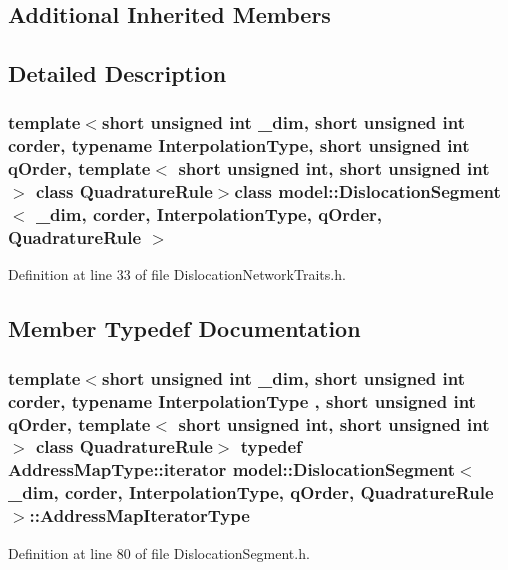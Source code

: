 \subsection*{Additional Inherited Members}


\subsection{Detailed Description}
\subsubsection*{template$<$short unsigned int \+\_\+dim, short unsigned int corder, typename Interpolation\+Type, short unsigned int q\+Order, template$<$ short unsigned int, short unsigned int $>$ class Quadrature\+Rule$>$class model\+::\+Dislocation\+Segment$<$ \+\_\+dim, corder, Interpolation\+Type, q\+Order, Quadrature\+Rule $>$}



Definition at line 33 of file Dislocation\+Network\+Traits.\+h.



\subsection{Member Typedef Documentation}
\hypertarget{classmodel_1_1_dislocation_segment_a43728c78eeaad4880736b8d7a42d1a3d}{}
\subsubsection[{Address\+Map\+Iterator\+Type}]{\setlength{\rightskip}{0pt plus 5cm}template$<$short unsigned int \+\_\+dim, short unsigned int corder, typename Interpolation\+Type , short unsigned int q\+Order, template$<$ short unsigned int, short unsigned int $>$ class Quadrature\+Rule$>$ typedef Address\+Map\+Type\+::iterator {\bf model\+::\+Dislocation\+Segment}$<$ \+\_\+dim, corder, Interpolation\+Type, q\+Order, Quadrature\+Rule $>$\+::{\bf Address\+Map\+Iterator\+Type}}\label{classmodel_1_1_dislocation_segment_a43728c78eeaad4880736b8d7a42d1a3d}


Definition at line 80 of file Dislocation\+Segment.\+h.

\hypertarget{classmodel_1_1_dislocation_segment_aabe470c119860a0360c9425a959afe04}{}
